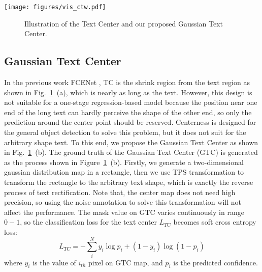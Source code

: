 \documentclass[sigconf]{acmart}
\begin{document}
	\begin{figure*}[t]
		\centering
		\texttt{[image: figures/vis\_ctw.pdf]}
		\caption{Visualizations of spotting results on test samples of CTW1500. Green lines are detection results, and the recognition results are marked nearby.}
		\label{fig:visctw}
	\end{figure*}
	
	\begin{figure}
		\centering
		\setlength{\abovecaptionskip}{5px}
		\subfigbottomskip=-3pt
		\subfigcapskip=-5pt
\vspace{2pt}
		\caption{Illustration of the Text Center \cite{long2018textsnake,zhu2021fourier} and our proposed Gaussian Text Center.}
		\label{fig:gauss_center}
		\vspace{-10px}
	\end{figure}
	
	\subsection{Gaussian Text Center}
	\label{sec:b2}
	In the previous work FCENet \cite{zhu2021fourier}, TC is the shrink region from the text region as shown in Fig.~\ref{fig:gauss_center}~(a), which is nearly as long as the text. However, this design is not suitable for a one-stage regression-based model because the position near one end of the long text can hardly perceive the shape of the other end, so only the prediction around the center point should be reserved. 
	Centerness \cite{Tian2019FCOS} is designed for the general object detection to solve this problem, but it does not suit for the arbitrary shape text. To this end, we propose the Gaussian Text Center as shown in Fig.~\ref{fig:gauss_center}~(b). 
The ground truth of the Gaussian Text Center (GTC) is generated as the process shown in Figure~\ref{fig:gauss_center}~(b). Firstly, we generate a two-dimensional gaussian distribution map in a rectangle, then we use TPS transformation to transform the rectangle to the arbitrary text shape, which is exactly the reverse process of text rectification. Note that, the center map does not need high precision, so using the noise annotation to solve this transformation will not affect the performance. The mask value on GTC varies continuously in range $0-1$, so the classification loss for the text center $L_{TC}$ becomes soft cross entropy loss:
	\begin{equation}
	L_{TC} =- \sum_i^N y_i \log p_i + (1-y_i) \log{(1-p_i)}
	\end{equation}
	where $y_i$ is the value of $i_{th}$ pixel on GTC map, and $p_i$ is the predicted confidence.
	
\end{document}
